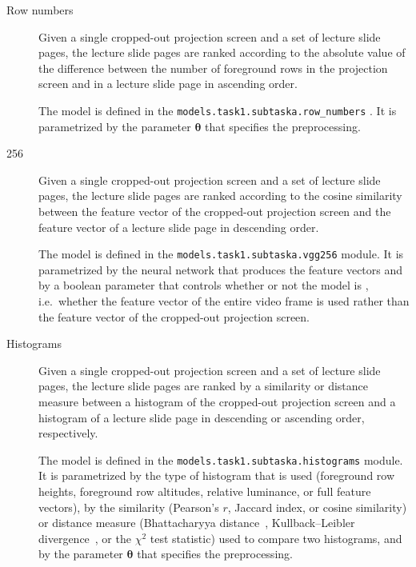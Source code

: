 \begin{description}
  \item[Row numbers]
    Given a single cropped-out projection screen and a set of lecture slide
    pages, the lecture slide pages are ranked according to the absolute value of
    the difference between the number of foreground rows in the projection
    screen and in a lecture slide page in ascending order.

    The model is defined in the
    \texttt{models.task1.subtaska.row\_numbers} .
    It is parametrized by the parameter $\bm\theta$ that specifies the
    preprocessing.

  \item[256]
    Given a single cropped-out projection screen and a set of lecture slide
    pages, the lecture slide pages are ranked according to the cosine
    similarity between the  feature vector of the cropped-out
    projection screen and the  feature vector of a lecture slide page
    in descending order.
    
    The model is defined in the
    \texttt{models.task1.subtaska.vgg256} module. It is parametrized by
    the neural network that produces the  feature vectors and by a
    boolean parameter that controls whether or not the model is
    , i.e.\ whether the  feature vector of the
    entire video frame is used rather than the  feature vector of the
    cropped-out projection screen.

  \item[Histograms]
    Given a single cropped-out projection screen and a set of lecture slide
    pages, the lecture slide pages are ranked by a similarity or distance
    measure between a histogram of the cropped-out projection screen and a
    histogram of a lecture slide page in descending or ascending order,
    respectively.

    The model is defined in the
    \texttt{models.task1.subtaska.histograms} module. It is parametrized by
    the type of histogram that is used (foreground row heights, foreground row
    altitudes, relative luminance, or full feature vectors), by the similarity
    (Pearson's $r$, Jaccard index, or cosine similarity) or distance measure
    (Bhattacharyya distance~\cite{bhattacharyya1943measure}, Kullback--Leibler
    divergence~\cite{kullback1951information}, or the $\chi^2$ test statistic)
    used to compare two histograms, and by the parameter $\bm\theta$ that
    specifies the preprocessing.


\end{description}
